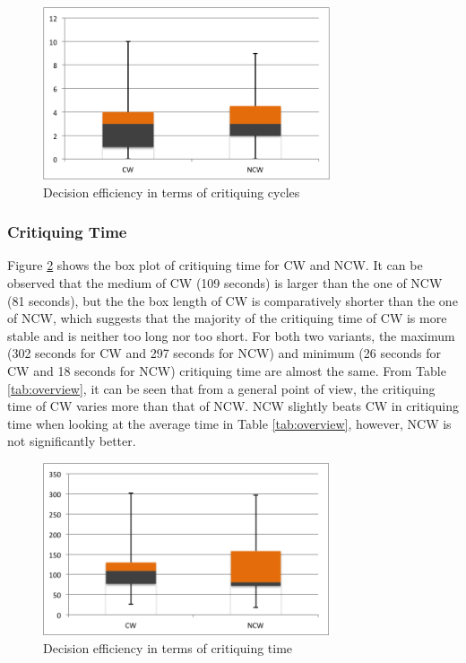 \begin{figure}[H]
	\centering
	\includegraphics[height=2in]{figures/critiquingCycles.png}
	\caption{Decision efficiency in terms of critiquing cycles}
	\label{fig:critiquingCycles}
\end{figure}

\subsubsection{Critiquing Time} \label{sec:results_de_ct}

Figure \ref{fig:critiquingTime} shows the box plot of critiquing time for CW and NCW. It can be observed that the medium of CW (109 seconds) is larger than the one of NCW (81 seconds), but the the box length of CW is comparatively shorter than the one of NCW, which suggests that the majority of the critiquing time of CW is more stable and is neither too long nor too short. For both two variants, the maximum (302 seconds for CW and 297 seconds for NCW) and minimum  (26 seconds for CW and 18 seconds for NCW) critiquing time are almost the same. 
From Table \ref{tab:overview}, it can be seen that from a general point of view, the critiquing time of CW varies more than that of NCW. NCW slightly beats CW in critiquing time when looking at the average time in Table \ref{tab:overview}, however, NCW is not significantly better.

\begin{figure}[H]
	\centering
	\includegraphics[height=2in]{figures/critiquingTime.png}
	\caption{Decision efficiency in terms of critiquing time}
	\label{fig:critiquingTime}
\end{figure}

